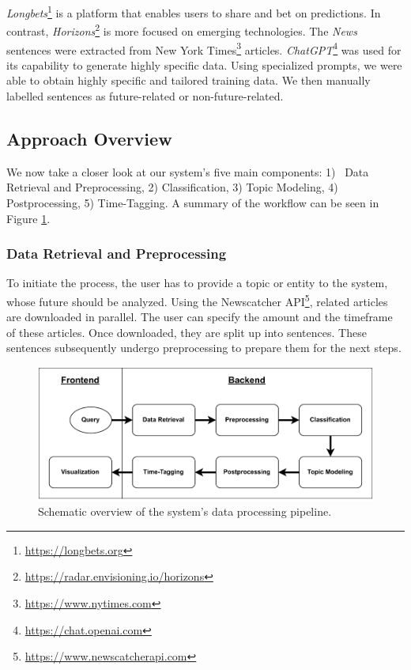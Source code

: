 \documentclass[sigconf]{acmart}
\begin{document}
\textit{Longbets}\footnote{\url{https://longbets.org}} is a platform that enables users to share and bet on predictions. In contrast, \textit{Horizons}\footnote{\url{https://radar.envisioning.io/horizons}} is more focused on emerging technologies. The \textit{News} sentences were extracted from New York Times\footnote{\url{https://www.nytimes.com}} articles. \textit{ChatGPT}\footnote{\url{https://chat.openai.com}} was used for its capability to generate highly specific data. Using specialized prompts, we were able to obtain highly specific and tailored training data. We then manually labelled sentences as future-related or non-future-related.


\subsection{Approach Overview}
We now take a closer look at our system's five main components: 1)~ Data Retrieval and Preprocessing, 2) Classification, 3) Topic Modeling, 4) Postprocessing, 5) Time-Tagging. A summary of the workflow can be seen in Figure \ref{fig:archi}.

\subsubsection{Data Retrieval and Preprocessing}
To initiate the process, the user has to provide a topic or entity to the system, whose future should be analyzed. Using the Newscatcher API\footnote{\url{https://www.newscatcherapi.com}}, related articles are downloaded in parallel. The user can specify the amount and the timeframe of these articles. Once downloaded, they are split up into sentences. These sentences subsequently undergo preprocessing to prepare them for the next steps.

\begin{figure}[H]
\centering
\includegraphics[width=\linewidth]{img/system.pdf}
\vspace*{-0.7cm}
\caption{Schematic overview of the system's data processing pipeline.}
\label{fig:archi}
\end{figure}
\end{document}

